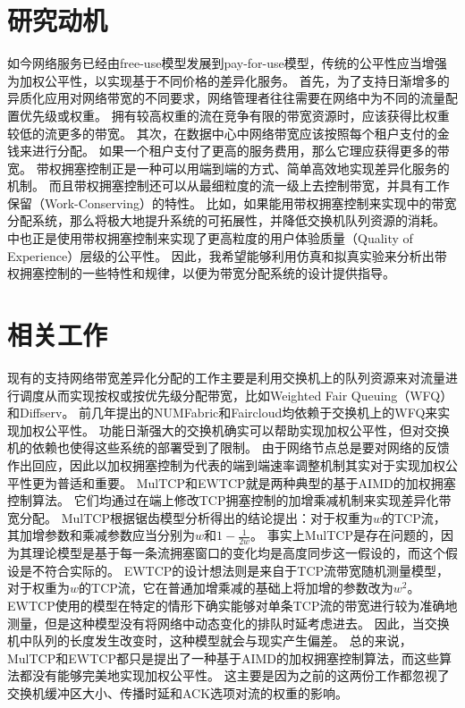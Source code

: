 \documentclass[winfonts]{njuthesis}
\begin{document}
\section{研究动机}

如今网络服务已经由free-use模型发展到pay-for-use模型，传统的公平性应当增强为加权公平性，以实现基于不同价格的差异化服务。
首先，为了支持日渐增多的异质化应用对网络带宽的不同要求，网络管理者往往需要在网络中为不同的流量配置优先级或权重\cite{Hong2013SWAN}。
拥有较高权重的流在竞争有限的带宽资源时，应该获得比权重较低的流更多的带宽。
其次，在数据中心中网络带宽应该按照每个租户支付的金钱来进行分配\cite{popa2012faircloud}。
如果一个租户支付了更高的服务费用，那么它理应获得更多的带宽。
带权拥塞控制正是一种可以用端到端的方式、简单高效地实现差异化服务的机制。
而且带权拥塞控制还可以从最细粒度的流一级上去控制带宽，并具有工作保留（Work-Conserving）的特性。
比如，如果能用带权拥塞控制来实现\cite{popa2012faircloud}中的带宽分配系统，那么将极大地提升系统的可拓展性，并降低交换机队列资源的消耗。
\cite{Nathan2019wcubic}中也正是使用带权拥塞控制来实现了更高粒度的用户体验质量（Quality of Experience）层级的公平性。
因此，我希望能够利用仿真和拟真实验来分析出带权拥塞控制的一些特性和规律，以便为带宽分配系统的设计提供指导。

\section{相关工作}

现有的支持网络带宽差异化分配的工作主要是利用交换机上的队列资源来对流量进行调度从而实现按权或按优先级分配带宽，比如Weighted Fair Queuing（WFQ）\cite{demers1989analysis}\cite{Abhay1993WFQ}和Diffserv\cite{Kathleen1998Diffserv}。
前几年提出的NUMFabric\cite{nagaraj2016numfabric}和Faircloud\cite{popa2012faircloud}均依赖于交换机上的WFQ来实现加权公平性。
功能日渐强大的交换机确实可以帮助实现加权公平性，但对交换机的依赖也使得这些系统的部署受到了限制。
由于网络节点总是要对网络的反馈作出回应，因此以加权拥塞控制为代表的端到端速率调整机制其实对于实现加权公平性更为普适和重要。
MulTCP\cite{crowcroft1998differentiated}和EWTCP\cite{wischik2011design}就是两种典型的基于AIMD的加权拥塞控制算法。
它们均通过在端上修改TCP拥塞控制的加增乘减机制来实现差异化带宽分配。
MulTCP根据锯齿模型分析得出的结论\cite{Floyd1997Sawtooth}提出：对于权重为$w$的TCP流，其加增参数和乘减参数应当分别为$w$和$1-\frac{1}{2w}$。
事实上MulTCP是存在问题的，因为其理论模型是基于每一条流拥塞窗口的变化均是高度同步这一假设的，而这个假设是不符合实际的。
EWTCP的设计想法则是来自于TCP流带宽随机测量模型\cite{padhye1998modeling}，对于权重为$w$的TCP流，它在普通加增乘减的基础上将加增的参数改为$w^2$。
EWTCP使用的模型在特定的情形下确实能够对单条TCP流的带宽进行较为准确地测量，但是这种模型没有将网络中动态变化的排队时延考虑进去。
因此，当交换机中队列的长度发生改变时，这种模型就会与现实产生偏差。
总的来说，MulTCP和EWTCP都只是提出了一种基于AIMD的加权拥塞控制算法，而这些算法都没有能够完美地实现加权公平性。
这主要是因为之前的这两份工作\cite{crowcroft1998differentiated}\cite{wischik2011design}都忽视了交换机缓冲区大小、传播时延和ACK选项对流的权重的影响。
\end{document}
